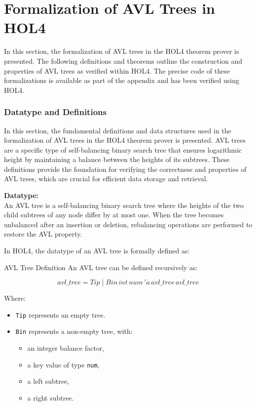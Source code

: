 \chapter{Formalization of AVL Trees in HOL4}\label{chap:relatedWork}

In this section, the formalization of AVL trees in the HOL4 theorem prover is presented. The following definitions and theorems outline the construction and properties of AVL trees as verified within HOL4. The precise code of these formalizations is available as part of the appendix and has been verified using HOL4.

\subsection{Datatype and Definitions}

In this section, the fundamental definitions and data structures used in the formalization of AVL trees in the HOL4 theorem prover is presented. AVL trees are a specific type of self-balancing binary search tree that ensures logarithmic height by maintaining a balance between the heights of its subtrees. These definitions provide the foundation for verifying the correctness and properties of AVL trees, which are crucial for efficient data storage and retrieval.

\textbf{Datatype:} \\
An AVL tree is a self-balancing binary search tree where the heights of the two child subtrees of any node differ by at most one. When the tree becomes unbalanced after an insertion or deletion, rebalancing operations are performed to restore the AVL property.

In HOL4, the datatype of an AVL tree is formally defined as:

\begin{defn}{AVL Tree Definition}
An AVL tree can be defined recursively as:

\[
    avl\_tree = Tip \mid Bin \, \mathit{int} \, \mathit{num} \, 'a \, avl\_tree \, avl\_tree
\]

Where:
\begin{itemize}
    \item \texttt{Tip} represents an empty tree.
    \item \texttt{Bin} represents a non-empty tree, with:
    \begin{itemize}
        \item an integer balance factor,
        \item a key value of type \texttt{num},
        \item a left subtree,
        \item a right subtree.
    \end{itemize}
\end{itemize}
\end{defn}

